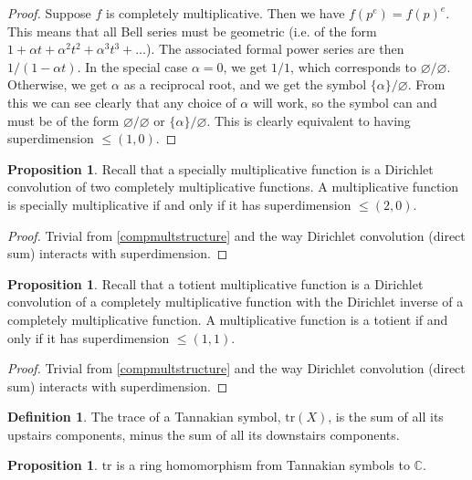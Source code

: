 \documentclass[a4paper]{article}
\theoremstyle{definition}
\newtheorem{definition}{Definition}[section]
\newtheorem{proposition}[theorem]{Proposition}
\theoremstyle{remark}
\newcommand{\tr}{\mathrm{tr}}
\newcommand{\C}{\mathbb{C}}
\begin{document}
\begin{proof}
Suppose $f$ is completely multiplicative. Then we have $f(p^e) = f(p)^e$. This means that all Bell series must be geometric (i.e. of the form $1 + \alpha t + \alpha^2 t^2 + \alpha^3 t^3 + \ldots$). The associated formal power series are then $1/(1 - \alpha t)$. In the special case $\alpha=0$, we get $1/1$, which corresponds to $\varnothing/\varnothing$. Otherwise, we get $\alpha$ as a reciprocal root, and we get the symbol $\{\alpha\}/\varnothing$. From this we can see clearly that any choice of $\alpha$ will work, so the symbol can and must be of the form $\varnothing/\varnothing$ or $\{\alpha\}/\varnothing$. This is clearly equivalent to having superdimension $\le (1, 0)$.
\end{proof}

\begin{proposition}
Recall that a specially multiplicative function is a Dirichlet convolution of two completely multiplicative functions. A multiplicative function is specially multiplicative if and only if it has superdimension $\le (2, 0)$.
\end{proposition}

\begin{proof}
Trivial from \ref{compmultstructure} and the way Dirichlet convolution (direct sum) interacts with superdimension.
\end{proof}

\begin{proposition}
Recall that a totient multiplicative function is a Dirichlet convolution of a completely multiplicative function with the Dirichlet inverse of a completely multiplicative function. A multiplicative function is a totient if and only if it has superdimension $\le (1, 1)$.
\end{proposition}

\begin{proof}
Trivial from \ref{compmultstructure} and the way Dirichlet convolution (direct sum) interacts with superdimension.
\end{proof}


\begin{definition}
The trace of a Tannakian symbol, $\tr(X)$, is the sum of all its upstairs components, minus the sum of all its downstairs components.
\end{definition}

\begin{proposition}
$\tr$ is a ring homomorphism from Tannakian symbols to $\C$.
\end{proposition}
\end{document}
